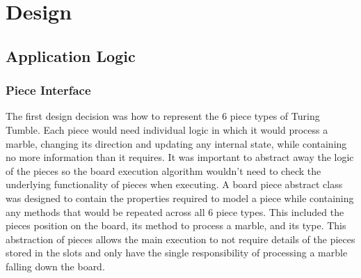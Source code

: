 \documentclass{l4proj}
\begin{document}
\chapter{Design}
\section{Application Logic}
\label{section:design}

\subsection{Piece Interface}
The first design decision was how to represent the 6 piece types of Turing Tumble. Each piece would need individual logic in which it would process a marble, changing its direction and updating any internal state, while containing no more information than it requires. It was important to abstract away the logic of the pieces so the board execution algorithm wouldn't need to check the underlying functionality of pieces when executing. A board piece abstract class was designed to contain the properties required to model a piece while containing any methods that would be repeated across all 6 piece types. This included the pieces position on the board, its method to process a marble, and its type. This abstraction of pieces allows the main execution to not require details of the pieces stored in the slots and only have the single responsibility of processing a marble falling down the board.
\end{document}
